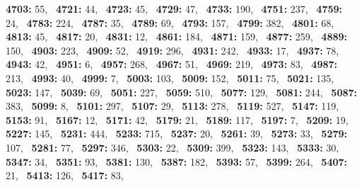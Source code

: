 \textbf{4703:} 55,\allowbreak~ 
\textbf{4721:} 44,\allowbreak~ 
\textbf{4723:} 45,\allowbreak~ 
\textbf{4729:} 47,\allowbreak~ 
\textbf{4733:} 190,\allowbreak~ 
\textbf{4751:} 237,\allowbreak~ 
\textbf{4759:} 24,\allowbreak~ 
\textbf{4783:} 224,\allowbreak~ 
\textbf{4787:} 35,\allowbreak~ 
\textbf{4789:} 69,\allowbreak~ 
\textbf{4793:} 157,\allowbreak~ 
\textbf{4799:} 382,\allowbreak~ 
\textbf{4801:} 68,\allowbreak~ 
\textbf{4813:} 45,\allowbreak~ 
\textbf{4817:} 20,\allowbreak~ 
\textbf{4831:} 12,\allowbreak~ 
\textbf{4861:} 184,\allowbreak~ 
\textbf{4871:} 159,\allowbreak~ 
\textbf{4877:} 259,\allowbreak~ 
\textbf{4889:} 150,\allowbreak~ 
\textbf{4903:} 223,\allowbreak~ 
\textbf{4909:} 52,\allowbreak~ 
\textbf{4919:} 296,\allowbreak~ 
\textbf{4931:} 242,\allowbreak~ 
\textbf{4933:} 17,\allowbreak~ 
\textbf{4937:} 78,\allowbreak~ 
\textbf{4943:} 42,\allowbreak~ 
\textbf{4951:} 6,\allowbreak~ 
\textbf{4957:} 268,\allowbreak~ 
\textbf{4967:} 51,\allowbreak~ 
\textbf{4969:} 219,\allowbreak~ 
\textbf{4973:} 83,\allowbreak~ 
\textbf{4987:} 213,\allowbreak~ 
\textbf{4993:} 40,\allowbreak~ 
\textbf{4999:} 7,\allowbreak~ 
\textbf{5003:} 103,\allowbreak~ 
\textbf{5009:} 152,\allowbreak~ 
\textbf{5011:} 75,\allowbreak~ 
\textbf{5021:} 135,\allowbreak~ 
\textbf{5023:} 147,\allowbreak~ 
\textbf{5039:} 69,\allowbreak~ 
\textbf{5051:} 227,\allowbreak~ 
\textbf{5059:} 510,\allowbreak~ 
\textbf{5077:} 129,\allowbreak~ 
\textbf{5081:} 244,\allowbreak~ 
\textbf{5087:} 383,\allowbreak~ 
\textbf{5099:} 8,\allowbreak~ 
\textbf{5101:} 297,\allowbreak~ 
\textbf{5107:} 29,\allowbreak~ 
\textbf{5113:} 278,\allowbreak~ 
\textbf{5119:} 527,\allowbreak~ 
\textbf{5147:} 119,\allowbreak~ 
\textbf{5153:} 91,\allowbreak~ 
\textbf{5167:} 12,\allowbreak~ 
\textbf{5171:} 42,\allowbreak~ 
\textbf{5179:} 21,\allowbreak~ 
\textbf{5189:} 117,\allowbreak~ 
\textbf{5197:} 7,\allowbreak~ 
\textbf{5209:} 19,\allowbreak~ 
\textbf{5227:} 145,\allowbreak~ 
\textbf{5231:} 444,\allowbreak~ 
\textbf{5233:} 715,\allowbreak~ 
\textbf{5237:} 20,\allowbreak~ 
\textbf{5261:} 39,\allowbreak~ 
\textbf{5273:} 33,\allowbreak~ 
\textbf{5279:} 107,\allowbreak~ 
\textbf{5281:} 77,\allowbreak~ 
\textbf{5297:} 346,\allowbreak~ 
\textbf{5303:} 22,\allowbreak~ 
\textbf{5309:} 399,\allowbreak~ 
\textbf{5323:} 143,\allowbreak~ 
\textbf{5333:} 30,\allowbreak~ 
\textbf{5347:} 34,\allowbreak~ 
\textbf{5351:} 93,\allowbreak~ 
\textbf{5381:} 130,\allowbreak~ 
\textbf{5387:} 182,\allowbreak~ 
\textbf{5393:} 57,\allowbreak~ 
\textbf{5399:} 264,\allowbreak~ 
\textbf{5407:} 21,\allowbreak~ 
\textbf{5413:} 126,\allowbreak~ 
\textbf{5417:} 83,\allowbreak~ 
